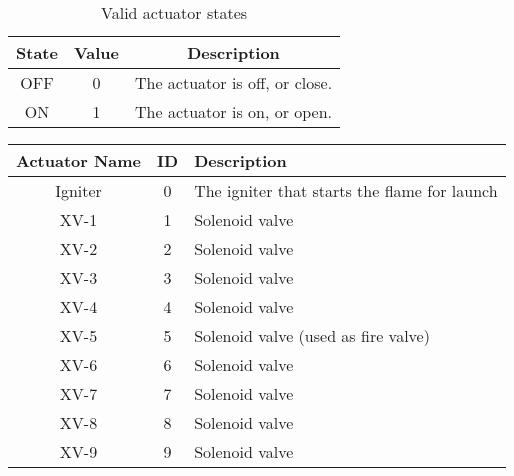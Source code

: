 \begin{table}[H]
    \centering
    \begin{tabular}{| c | c | c |}
        \hline
        State & Value & Description                    \\
        \hline
        OFF   & 0     & The actuator is off, or close. \\
        \hline
        ON    & 1     & The actuator is on, or open.   \\
        \hline
    \end{tabular}
    \caption{Valid actuator states}
    \label{tbl:actuator-states}
\end{table}

\begin{table}
    \centering
    \begin{tabular}{| c | c | p{3in} |}
        \hline
        Actuator Name    & ID & Description                                                              \\
        \hline
        Igniter          & 0  & The igniter that starts the flame for launch                             \\
        \hline
        XV-1             & 1  & Solenoid valve                                                           \\
        \hline
        XV-2             & 2  & Solenoid valve                                                           \\
        \hline
        XV-3             & 3  & Solenoid valve                                                           \\
        \hline
        XV-4             & 4  & Solenoid valve                                                           \\
        \hline
        XV-5             & 5  & Solenoid valve (used as fire valve)                                      \\
        \hline
        XV-6             & 6  & Solenoid valve                                                           \\
        \hline
        XV-7             & 7  & Solenoid valve                                                           \\
        \hline
        XV-8             & 8  & Solenoid valve                                                           \\
        \hline
        XV-9             & 9  & Solenoid valve                                                           \\

\end{tabular}
\end{table}
